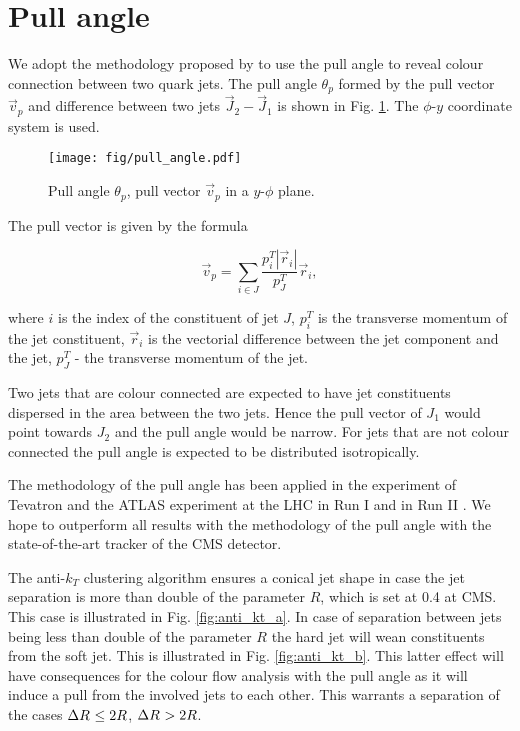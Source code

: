 \section{Pull angle}

We adopt the methodology proposed by \cite{Gallicchio:2010sw} to use the pull angle to reveal colour connection between two quark jets. The pull angle $\theta_{p}$ formed by the pull vector $\vec{v}_{p}$ and difference between two jets $\vec{J}_{2}-\vec{J}_{1}$ is shown in Fig. \ref{fig:pull_angle}. The $\phi$-$y$ coordinate system is used. 

\begin{figure}[hbtp]
  \centering
  \texttt{[image: fig/pull\_angle.pdf]}
  \caption{Pull angle $\theta_{p}$, pull vector $\vec{v}_{p}$ in a $y$-$\phi$ plane.}
  \label{fig:pull_angle}
\end{figure}

The pull vector is given by the formula

\begin{equation}
  \vec{v}_{p}=\sum_{i\in J}\frac{p^{T}_{i}|\vec{r}_{i}|}{p^{T}_{J}}\vec{r}_{i},
  \label{Eq:pull_angle}
\end{equation}

where $i$ is the index of the constituent of jet $J$, $p^{T}_{i}$ is the transverse momentum of the jet constituent, $\vec{r}_{i}$ is the vectorial difference between the jet component and the jet, $p^{T}_{J}$ - the transverse momentum of the jet.

Two jets that are colour connected are expected to have jet constituents dispersed in the area between the two jets. Hence the pull vector of $J_{1}$ would point towards $J_{2}$ and the pull angle would be narrow. For jets that are not colour connected the pull angle is expected to be distributed isotropically.

The methodology of the pull angle has been applied in the \DZERO experiment of Tevatron \cite{Abazov:2011vh} and the ATLAS experiment at the LHC in Run I \cite{Aad:2015lxa} and in Run II \cite{ATLAS:2017iaz}. We hope to outperform all results with the methodology of the pull angle with the state-of-the-art tracker of the CMS detector.

The anti-$k_{T}$ clustering algorithm ensures a conical jet shape in case the jet separation \DeltaR is more than double of the parameter $R$, which is set at 0.4 at CMS. This case is illustrated in Fig. \ref{fig:anti_kt_a}. In case of separation between jets \DeltaR being less than double of the parameter $R$ the hard jet will wean constituents from the soft jet. This is illustrated in Fig. \ref{fig:anti_kt_b}. This latter effect will have consequences for the colour flow analysis with the pull angle as it will induce a pull from the involved jets to each other. This warrants a separation of the cases $\Delta R^{}\leq2R$, $\Delta R^{}>2R$. 

